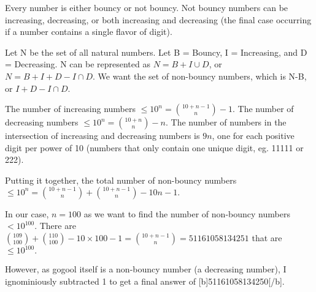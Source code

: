 Every number is either bouncy or not bouncy. Not bouncy numbers can be increasing, decreasing, or both increasing and decreasing (the final case occurring if a number contains a single flavor of digit). 

Let N be the set of all natural numbers. Let B = Bouncy, I = Increasing, and D = Decreasing. N can be represented as $N = B + I\cup D$, or $N = B + I + D - I\cap D.$ We want the set of non-bouncy numbers, which is N-B, or $I + D - I\cap D.$ 

The number of increasing numbers $\le10^n = \binom{10+n-1}{n} - 1.$
The number of decreasing numbers $\le10^n = \binom{10+n}{n} - n.$
The number of numbers in the intersection of increasing and decreasing numbers is $9n$, one for each positive digit per power of 10 (numbers that only contain one unique digit, eg. 11111 or 222). 

Putting it together, the total number of non-bouncy numbers $\le10^n = \binom{10+n-1}{n} +\binom{10+n-1}{n} - 10n - 1.$

In our case, $n = 100$ as we want to find the number of non-bouncy numbers $<10^{100}.$ There are $\binom{109}{100}  + \binom{110}{100} - 10\times100 - 1 = \binom{10+n-1}{n} = 51161058134251$ that are $\le 10^{100}.$

However, as gogool itself is a non-bouncy number (a decreasing number), I ignominiously subtracted 1 to get a final answer of [b]51161058134250[/b].